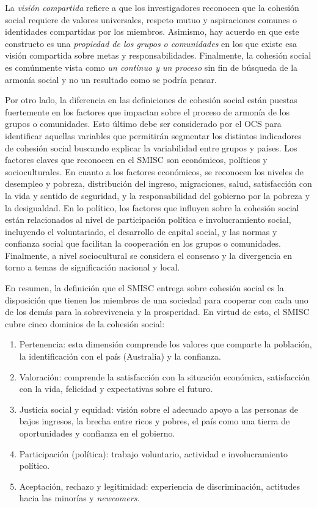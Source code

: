 \documentclass[
  12pt,
]{book}
\begin{document}
La \emph{visión compartida} refiere a que los investigadores reconocen que la cohesión social requiere de valores universales, respeto mutuo y aspiraciones comunes o identidades compartidas por los miembros. Asimismo, hay acuerdo en que este constructo es una \emph{propiedad de los grupos o comunidades} en los que existe esa visión compartida sobre metas y responsabilidades. Finalmente, la cohesión social es comúnmente vista como \emph{un continuo y un proceso} sin fin de búsqueda de la armonía social y no un resultado como se podría pensar.

Por otro lado, la diferencia en las definiciones de cohesión social están puestas fuertemente en los factores que impactan sobre el proceso de armonía de los grupos o comunidades. Esto último debe ser considerado por el OCS para identificar aquellas variables que permitirán segmentar los distintos indicadores de cohesión social buscando explicar la variabilidad entre grupos y países. Los factores claves que reconocen en el SMISC son económicos, políticos y socioculturales. En cuanto a los factores económicos, se reconocen los niveles de desempleo y pobreza, distribución del ingreso, migraciones, salud, satisfacción con la vida y sentido de seguridad, y la responsabilidad del gobierno por la pobreza y la desigualdad. En lo político, los factores que influyen sobre la cohesión social están relacionados al nivel de participación política e involucramiento social, incluyendo el voluntariado, el desarrollo de capital social, y las normas y confianza social que facilitan la cooperación en los grupos o comunidades. Finalmente, a nivel sociocultural se considera el consenso y la divergencia en torno a temas de significación nacional y local.

En resumen, la definición que el SMISC entrega sobre cohesión social es la disposición que tienen los miembros de una sociedad para cooperar con cada uno de los demás para la sobrevivencia y la prosperidad. En virtud de esto, el SMISC cubre cinco dominios de la cohesión social:

\begin{enumerate}
\def\labelenumi{\arabic{enumi}.}
\item
  Pertenencia: esta dimensión comprende los valores que comparte la población, la identificación con el país (Australia) y la confianza.
\item
  Valoración: comprende la satisfacción con la situación económica, satisfacción con la vida, felicidad y expectativas sobre el futuro.
\item
  Justicia social y equidad: visión sobre el adecuado apoyo a las personas de bajos ingresos, la brecha entre ricos y pobres, el país como una tierra de oportunidades y confianza en el gobierno.
\item
  Participación (política): trabajo voluntario, actividad e involucramiento político.
\item
  Aceptación, rechazo y legitimidad: experiencia de discriminación, actitudes hacia las minorías y \emph{newcomers}.
\end{enumerate}
\end{document}
